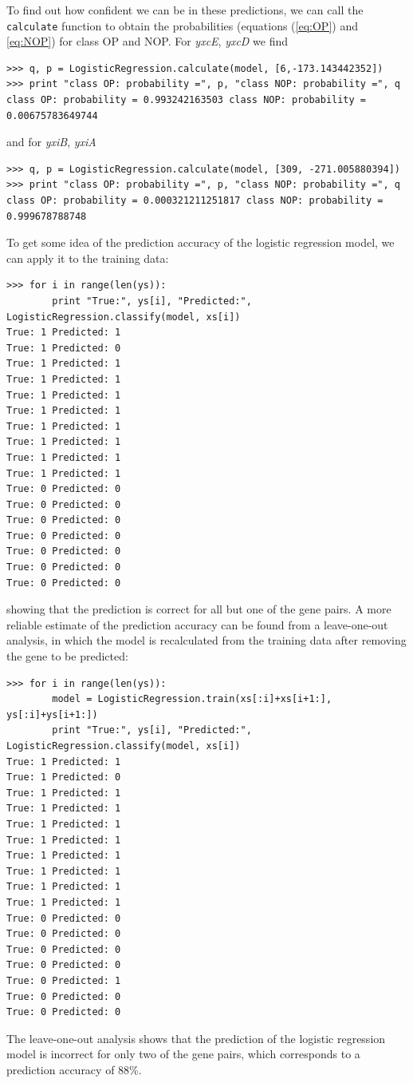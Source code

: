\documentclass{report}
\begin{document}
To find out how confident we can be in these predictions, we can call the \verb+calculate+ function to obtain the probabilities (equations (\ref{eq:OP}) and \ref{eq:NOP}) for class OP and NOP. For {\it yxcE}, {\it yxcD} we find
\begin{verbatim}
>>> q, p = LogisticRegression.calculate(model, [6,-173.143442352])
>>> print "class OP: probability =", p, "class NOP: probability =", q
class OP: probability = 0.993242163503 class NOP: probability = 0.00675783649744
\end{verbatim}
and for {\it yxiB}, {\it yxiA}
\begin{verbatim}
>>> q, p = LogisticRegression.calculate(model, [309, -271.005880394])
>>> print "class OP: probability =", p, "class NOP: probability =", q
class OP: probability = 0.000321211251817 class NOP: probability = 0.999678788748
\end{verbatim}

To get some idea of the prediction accuracy of the logistic regression model, we can apply it to the training data:
\begin{verbatim}
>>> for i in range(len(ys)):
        print "True:", ys[i], "Predicted:", LogisticRegression.classify(model, xs[i])
True: 1 Predicted: 1
True: 1 Predicted: 0
True: 1 Predicted: 1
True: 1 Predicted: 1
True: 1 Predicted: 1
True: 1 Predicted: 1
True: 1 Predicted: 1
True: 1 Predicted: 1
True: 1 Predicted: 1
True: 1 Predicted: 1
True: 0 Predicted: 0
True: 0 Predicted: 0
True: 0 Predicted: 0
True: 0 Predicted: 0
True: 0 Predicted: 0
True: 0 Predicted: 0
True: 0 Predicted: 0
\end{verbatim}
showing that the prediction is correct for all but one of the gene pairs. A more reliable estimate of the prediction accuracy can be found from a leave-one-out analysis, in which the model is recalculated from the training data after removing the gene to be predicted:
\begin{verbatim}
>>> for i in range(len(ys)):
        model = LogisticRegression.train(xs[:i]+xs[i+1:], ys[:i]+ys[i+1:])
        print "True:", ys[i], "Predicted:", LogisticRegression.classify(model, xs[i])
True: 1 Predicted: 1
True: 1 Predicted: 0
True: 1 Predicted: 1
True: 1 Predicted: 1
True: 1 Predicted: 1
True: 1 Predicted: 1
True: 1 Predicted: 1
True: 1 Predicted: 1
True: 1 Predicted: 1
True: 1 Predicted: 1
True: 0 Predicted: 0
True: 0 Predicted: 0
True: 0 Predicted: 0
True: 0 Predicted: 0
True: 0 Predicted: 1
True: 0 Predicted: 0
True: 0 Predicted: 0
\end{verbatim}
The leave-one-out analysis shows that the prediction of the logistic regression model is incorrect for only two of the gene pairs, which corresponds to a prediction accuracy of 88\%.
\end{document}
